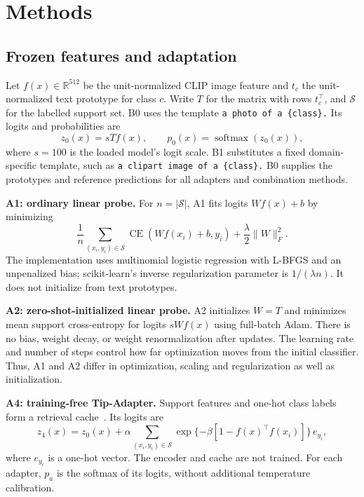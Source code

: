 \section{Methods}
\label{sec:methods}
\subsection{Frozen features and adaptation}
Let $f(x)\in\mathbb{R}^{512}$ be the unit-normalized CLIP image feature and $t_c$ the unit-normalized text prototype for class $c$. Write $T$ for the matrix with rows $t_c^\top$, and $\mathcal{S}$ for the labelled support set. B0 uses the template \texttt{a photo of a \{class\}.} Its logits and probabilities are
\begin{equation}
 z_0(x)=sTf(x), \qquad p_0(x)=\operatorname{softmax}(z_0(x)),
\end{equation}
where $s=100$ is the loaded model's logit scale. B1 substitutes a fixed domain-specific template, such as \texttt{a clipart image of a \{class\}.} B0 supplies the prototypes and reference predictions for all adapters and combination methods.

\textbf{A1: ordinary linear probe.}
For $n=|\mathcal{S}|$, A1 fits logits $Wf(x)+b$ by minimizing
\begin{equation}
 \frac{1}{n}\sum_{(x_i,y_i)\in\mathcal{S}}
 \operatorname{CE}(Wf(x_i)+b,y_i)+\frac{\lambda}{2}\|W\|_F^2 .
\end{equation}
The implementation uses multinomial logistic regression with L-BFGS and an unpenalized bias; scikit-learn's inverse regularization parameter is $1/(\lambda n)$. It does not initialize from text prototypes.

\textbf{A2: zero-shot-initialized linear probe.}
A2 initializes $W=T$ and minimizes mean support cross-entropy for logits $sWf(x)$ using full-batch Adam. There is no bias, weight decay, or weight renormalization after updates. The learning rate and number of steps control how far optimization moves from the initial classifier. Thus, A1 and A2 differ in optimization, scaling and regularization as well as initialization.

\textbf{A4: training-free Tip-Adapter.}
Support features and one-hot class labels form a retrieval cache~\citep{zhang2022tip}. Its logits are
\begin{equation}
 z_4(x)=z_0(x)+\alpha\sum_{(x_i,y_i)\in\mathcal{S}}
 \exp\{-\beta[1-f(x)^\top f(x_i)]\}\,e_{y_i},
\end{equation}
where $e_{y_i}$ is a one-hot vector. The encoder and cache are not trained. For each adapter, $p_a$ is the softmax of its logits, without additional temperature calibration.

